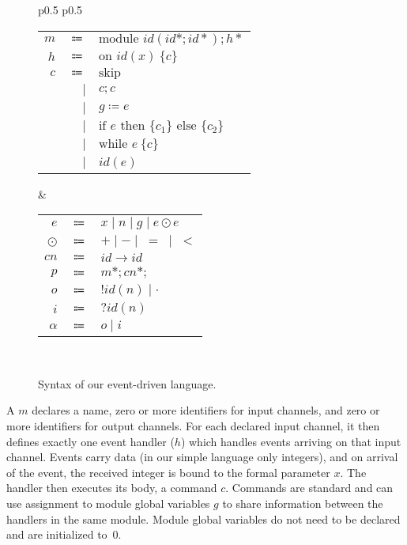 \begin{figure}
  \begin{tabular}{p{} p{}}
    \begin{minipage}{0.5\textwidth}
      \centering
      \begin{tabular}{rrl}
        $m$ & $\Coloneqq$ & $\textrm{module\ }id( id*;id*);  h*$ \\
        $h$ & $\Coloneqq$ & $\textrm{on } id(x) \: \{c\}$ \\
        $c$ & $\Coloneqq$ & $\textrm{skip}$ \\
        & $\mid$ & $c; c$ \\
        & $\mid$ & $g\coloneqq e$ \\
        & $\mid$ & $\textrm{if } e \textrm{ then } \{ c_1 \} \textrm{ else } \{ c_2 \}$ \\
        & $\mid$ & $\textrm{while } e \: \{c\}$ \\
        & $\mid$ & $id(e)$ \\
      \end{tabular}
    \end{minipage} &
    \begin{minipage}{0.5\textwidth}
      \centering
      \begin{tabular}{rrl}
        $e$ & $\Coloneqq$ & $x \mid n \mid g \mid e \odot e$ \\
        $\odot$ & $\Coloneqq$ & $+ \mid - \mid \; = \; \mid \; <$ \\
        $cn$ & $\Coloneqq$ & $id \to id $ \\
        $p$ & $\Coloneqq$ & $m* ; cn* ;$ \\
        $o$ & $\Coloneqq$ & $ !id(n) \mid \cdot $ \\
        $i$ & $\Coloneqq$ & $  ?id(n) $ \\
        $\alpha$ & $\Coloneqq$ & $ o \mid i$
      \end{tabular}
    \end{minipage} \\
  \end{tabular}
  \caption{Syntax of our event-driven language.}
  \label{fig:syntaxmodellang}
\end{figure}

A \emph{\reactmod} $m$ declares a name,  zero or more identifiers for input
channels, and zero or more identifiers for output channels.  For each
declared input channel, it then defines exactly one event handler ($h$)
which  handles events arriving on that input channel.  Events carry data
(in our simple language only integers), and on arrival of the event, the
received integer is bound to the formal parameter $x$. The handler then
executes its body, a command $c$. Commands are standard and can use
assignment to module global variables $g$ to share information between the
handlers in the same module. Module global variables do not need to be
declared and are initialized to~0.

